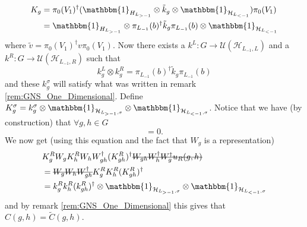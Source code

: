 \documentclass[12pt,a4paper,twoside]{article}
\newcommand{\stkout}[1]{\ifmmode\text{\sout{\ensuremath{#1}}}\else\sout{#1}\fi}
\newcommand{\UU}{\mathcal U}
\newcommand{\HH}{\mathcal H}
\newcommand{\ZZ}{\mathbb Z}
\newcommand{\id}{\mathbbm{1}}
\theoremstyle{definition}
\numberwithin{equation}{section}
\begin{document}
\begin{align}
	K_g&=\pi_{0}(V_1)^{\dagger}(\id_{H_{L_{>-1}}}\otimes \tilde k_g \otimes\id_{\HH_{L_{<-1}}}) \pi_{0}(V_1)\\
	&=\id_{H_{L_{>-1}}}\otimes \pi_{L_{-1}}(b)^\dagger \tilde k_g \pi_{L_{-1}}(b) \otimes\id_{\HH_{L_{<-1}}}
\end{align}
where $\tilde{v}=\pi_0(V_1)^\dagger v\pi_0(V_1)$. Now there exists a $k^L:G\rightarrow \UU(\HH_{L_{-1},L})$ and a $k^R:G\rightarrow \UU(\HH_{L_{-1},R})$ such that
\begin{equation}
	k^L_g\otimes k^R_g=\pi_{L_{-1}}(b)^\dagger \tilde k_g \pi_{L_{-1}}(b)
\end{equation}
and these $k^\sigma_g$ will satisfy what was written in remark \ref{rem:GNS_One_Dimensional}. Define $K^\sigma_g=k^\sigma_g\otimes\id_{\HH_{L_{>-1},\sigma}}\otimes\id_{\HH_{L_{<-1},\sigma}}$. Notice that we have (by construction) that $\forall g,h\in G$
\begin{equation}
	[K^\sigma_g\otimes\id_{\HH_{\ZZ^2/\sigma}},W_h]=0.
\end{equation}
We now get (using this equation and the fact that $W_g$ is a representation)
\begin{align}
	&K_g^R W_g K_h^R W_h W_{gh}^\dagger (K_{gh}^R)^\dagger \stkout{W_{gh}W_h^\dagger W_g^\dagger u_R(g,h)}\\
	&=\stkout{W_g W_h W_{gh}^\dagger} K_g^R K_h^R (K_{gh}^R)^\dagger\\
	&=k_g^R k_h^R (k_{gh}^R)^\dagger\otimes \id_{\HH_{L_{>-1},\sigma}}\otimes\id_{\HH_{L_{<-1},\sigma}}
\end{align}
and by remark \ref{rem:GNS_One_Dimensional} this gives that $C(g,h)=\tilde{C}(g,h)$.
\end{document}
